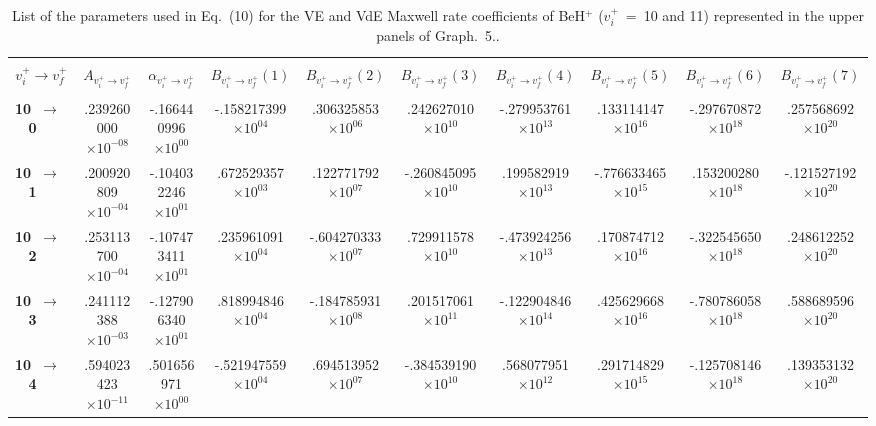 \documentclass[reviewcopy]{elsarticle}
\begin{document}
\begin{landscape}
\renewcommand{\thefootnote}{\fnsymbol{footnote}}
\renewcommand{\arraystretch}{0.81}
\scriptsize
\setlength\tabcolsep{1.2ex}
\begin{longtable}{lccccccccc}
\caption[table7]{List of the parameters used in Eq.~(10) for the VE and VdE Maxwell rate coefficients of BeH$^+$  ($v^+_i$~=~10 and 11) represented in the upper panels of Graph.~5..}\label{tab:BeH_VE_Interpolation10-11}\vspace{0.5cm}\\
\hline \\[-2ex]
   \multicolumn{1}{c}{$v^+_i \to v^+_f$} &
   \multicolumn{1}{c}{$A_{{v^+_i}\to {v^+_f}}$} &
   \multicolumn{1}{c}{$\alpha_{{v^+_i}\to {v^+_f}}$} &
   \multicolumn{1}{c}{$B_{{v^+_i}\to {v^+_f}}(1)$} &
   \multicolumn{1}{c}{$B_{{v^+_i}\to {v^+_f}}(2)$} &
   \multicolumn{1}{c}{$B_{{v^+_i}\to {v^+_f}}(3)$} &
   \multicolumn{1}{c}{$B_{{v^+_i}\to {v^+_f}}(4)$}  &
   \multicolumn{1}{c}{$B_{{v^+_i}\to {v^+_f}}(5)$} &
   \multicolumn{1}{c}{$B_{{v^+_i}\to {v^+_f}}(6)$} &
   \multicolumn{1}{c}{$B_{{v^+_i}\to {v^+_f}}(7)$} \\[5pt]
 \hline \\[-2ex]
\endhead
{\bf 10~$\to$~ 0 }  &   .239260000$\times10^{-08}$ & -.166440996$\times10^{ 00}$ & -.158217399$\times10^{ 04}$ &  .306325853$\times10^{ 06}$ &  .242627010$\times10^{ 10}$ & -.279953761$\times10^{ 13}$ &  .133114147$\times10^{ 16}$ & -.297670872$\times10^{ 18}$ & .257568692$\times10^{ 20}$ \\
{\bf 10~$\to$~ 1}   &   .200920809$\times10^{-04}$ & -.104032246$\times10^{ 01}$ &  .672529357$\times10^{ 03}$ &  .122771792$\times10^{ 07}$ & -.260845095$\times10^{ 10}$ &  .199582919$\times10^{ 13}$ & -.776633465$\times10^{ 15}$ &  .153200280$\times10^{ 18}$ & -.121527192$\times10^{ 20}$ \\
{\bf 10~$\to$~ 2}   &   .253113700$\times10^{-04}$ & -.107473411$\times10^{ 01}$ &  .235961091$\times10^{ 04}$ & -.604270333$\times10^{ 07}$ &  .729911578$\times10^{ 10}$ & -.473924256$\times10^{ 13}$ &  .170874712$\times10^{ 16}$ & -.322545650$\times10^{ 18}$ &  .248612252$\times10^{ 20}$ \\
{\bf 10~$\to$~ 3}   &  .241112388$\times10^{-03}$ & -.127906340$\times10^{ 01}$ &  .818994846$\times10^{ 04}$ & -.184785931$\times10^{ 08}$ &  .201517061$\times10^{ 11}$ & -.122904846$\times10^{ 14}$ &  .425629668$\times10^{ 16}$ & -.780786058$\times10^{ 18}$ &  .588689596$\times10^{ 20}$ \\
{\bf 10~$\to$~ 4}   &   .594023423$\times10^{-11}$ &  .501656971$\times10^{ 00}$ & -.521947559$\times10^{ 04}$ &  .694513952$\times10^{ 07}$ & -.384539190$\times10^{ 10}$ &  .568077951$\times10^{ 12}$ &  .291714829$\times10^{ 15}$ & -.125708146$\times10^{ 18}$ & .139353132$\times10^{ 20}$ \\

\end{longtable}
\end{landscape}
\end{document}
